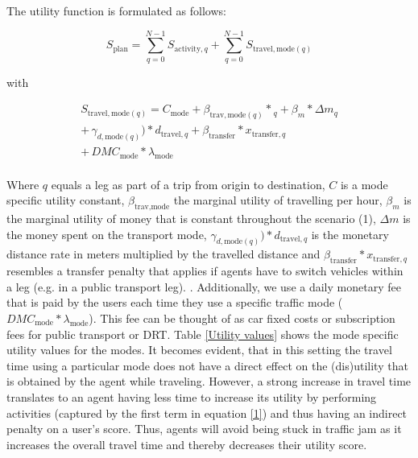 \documentclass[a4paper]{article}
\begin{document}
The utility function is formulated as follows: 

 \begin{equation}
S_{\text{plan}}=\sum_{q=0}^{N-1} S_{\text{activity},q} + \sum_{q=0}^{N-1} S_{\text{travel},\text{mode}(q)}
\label{1}
\end{equation}

with

\begin{equation}
\begin{aligned}
   S_{\text{travel},\text{mode}(q)} =   C_{\text{mode}} + \beta_{\text{trav}, \text{mode}(q)} * \text{}_{q} + \beta_{m}*\Delta m_{q} \\
    +\, \gamma_{d,\text{mode}(q)})* d_{\text{travel},q} +\beta_{\text{transfer}} * x_{\text{transfer},q} \\
    +\,  DMC_{\text{mode}} * \lambda_{\text{mode}}
\end{aligned}
\end{equation}
\\ 
Where $q$ equals a leg as part of a trip from origin to destination, $C$ is a mode specific utility constant, $\beta_{\text{trav},\text{mode}}$ the marginal utility of travelling per hour, $\beta_{m}$ is the marginal utility of money that is constant throughout the scenario (1), $\Delta m$ is the money spent on the transport mode, $\gamma_{d,\text{mode}(q)})* d_{\text{travel},q}$ is the monetary distance rate in meters multiplied by the travelled distance and $\beta_{\text{transfer}} * x_{\text{transfer},q}$ resembles a transfer penalty that applies if agents have to switch vehicles within a leg (e.g. in a public transport leg). \citep{Horni.2016}. Additionally, we use a daily monetary fee that is paid by the users each time they use a specific traffic mode ($DMC_{\text{mode}} * \lambda_{\text{mode}}$). This fee can be thought of as car fixed costs or subscription fees for public transport or DRT. Table \ref{Utility values} shows the mode specific utility values for the modes. It becomes evident, that in this setting the travel time using a particular mode does not have a direct effect on the (dis)utility that is obtained by the agent while traveling. However, a strong increase in travel time translates to an agent having less time to increase its utility by performing activities (captured by the first term in equation \ref{1}) and thus having an indirect penalty on a user's score. Thus, agents will avoid being stuck in traffic jam as it increases the overall travel time and thereby decreases their utility score. 
\end{document}
